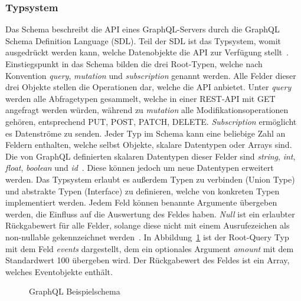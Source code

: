 \subsubsection{Typsystem}
Das Schema beschreibt die API eines GraphQL-Servers durch die GraphQL Schema Definition Language (SDL).
Teil der SDL ist das Typsystem, womit ausgedrückt werden kann, welche Datenobjekte die API zur Verfügung stellt~\cite[vgl.][]{GraphQL-spec-github}.
Einstiegspunkt in das Schema bilden die drei Root-Typen, welche nach Konvention \emph{query}, \emph{mutation} und \emph{subscription} genannt werden.
Alle Felder dieser drei Objekte stellen die Operationen dar, welche die API anbietet.
Unter \emph{query} werden alle Abfragetypen gesammelt, welche in einer REST-API mit GET angefragt werden würden, während zu \emph{mutation} alle Modifikationsoperationen gehören, entsprechend PUT, POST, PATCH, DELETE.
\emph{Subscription} ermöglicht es Datenströme zu senden.
Jeder Typ im Schema kann eine beliebige Zahl an Feldern enthalten, welche selbst Objekte, skalare Datentypen oder Arrays sind.
Die von GraphQL definierten skalaren Datentypen dieser Felder sind \emph{string}, \emph{int}, \emph{float}, \emph{boolean} und \emph{id}~\cite[vgl.][]{GraphQL-Spec}.
Diese können jedoch um neue Datentypen erweitert werden.
Das Typsystem erlaubt es außerdem Typen zu verbinden (Union Type) und abstrakte Typen (Interface) zu definieren, welche von konkreten Typen implementiert werden.
Jedem Feld können benannte Argumente übergeben werden, die Einfluss auf die Auswertung des Feldes haben.
\emph{Null} ist ein erlaubter Rückgabewert für alle Felder, solange diese nicht mit einem Ausrufezeichen als non-nullable gekennzeichnet werden~\cite[vgl.][]{GraphQL-Spec}.
In Abbildung~\ref{code:gql-schema} ist der Root-Query Typ mit dem Feld \emph{events} dargestellt, dem ein optionales Argument \emph{amount} mit dem Standardwert 100 übergeben wird.
Der Rückgabewert des Feldes ist ein Array, welches Eventobjekte enthält.
\begin{figure}[h]
  \centering
  \caption{GraphQL Beispielschema}\label{code:gql-schema}
\end{figure}

